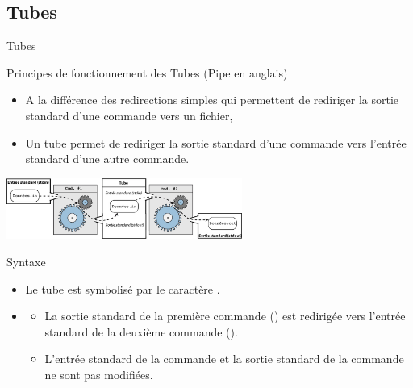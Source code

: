 \subsection{Tubes}
\begin{frame}{Tubes}
  \begin{block}{Principes de fonctionnement des Tubes (Pipe en anglais)}
    \begin{itemize}
    \item A la différence des redirections simples qui permettent de
      rediriger la sortie standard d'une commande vers un fichier,
    \item {\color{solarizedRed}Un tube permet de rediriger la sortie standard
        d'une commande vers l'entrée standard d'une autre commande}.
    \end{itemize}
  \end{block}
  \begin{center}
    \includegraphics[height=2cm]{img/s05/stdin_stdout_tube_1.jpg}
  \end{center}
  \begin{alertblock}{Syntaxe}
    \begin{itemize}
    \item Le tube est symbolisé par le caractère \lin{|}.
    \item {}
      \begin{itemize}
      \item La sortie standard de la première commande () est
        redirigée vers l'entrée standard de la deuxième commande
        ().
      \item L'entrée standard de la commande  et la sortie
        standard de la commande  ne sont pas modifiées.
      \end{itemize}
    \end{itemize}
  \end{alertblock}
\end{frame}


